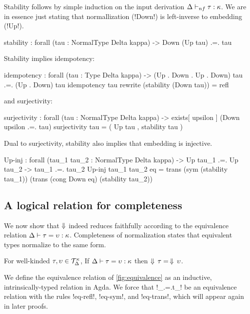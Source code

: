 \documentclass[sigplan,10pt,anonymous,review]{acmart}\settopmatter{printfolios=true,printccs=false,printacmref=false}
\begin{document}
Stability follows by simple induction on the input derivation $\Delta \vdash_{nf} \tau : \kappa$. We are in essence just stating that normallization (!Down!) is left-inverse to embedding (!Up!).

\begin{agda}
stability : forall (tau : NormalType Delta kappa) -> Down (Up tau) .=. tau
\end{agda}
Stability implies idempotency:
\begin{agda}
idempotency : forall (tau : Type Delta kappa) -> 
              (Up . Down . Up . Down) tau .=. (Up . Down) tau
idempotency tau rewrite (stability (Down tau)) = refl
\end{agda}
\Ni and surjectivity: 

\begin{agda}
surjectivity : forall (tau : NormalType Delta kappa) -> 
               exists[ upsilon ] (Down upsilon .=. tau)
surjectivity tau = ( Up tau , stability tau )
\end{agda}

Dual to surjectivity, stability also implies that embedding is injective.

\begin{agda}
Up-inj : forall (tau_1  tau_2 : NormalType Delta kappa) -> 
         Up tau_1 .=. Up tau_2 -> tau_1 .=. tau_2
Up-inj  tau_1  tau_2  eq = 
  trans 
    (sym (stability tau_1))          
    (trans 
      (cong Down eq)
      (stability tau_2))
\end{agda}

\subsection{A logical relation for completeness}

We now show that $\Downarrow$ indeed reduces faithfully according to the equivalence relation $\Delta \vdash \tau = \upsilon : \kappa$. Completeness of normalization states that equivalent types normalize to the same form.

\ifthms
\begin{theorem}[Completeness]
For well-kinded $\tau , \upsilon \in {\mathcal T}_{\Delta}^{\kappa}$, If $\Delta \vdash \tau = \upsilon : \kappa$ then $\Downarrow\, \tau = \, \Downarrow \, \upsilon$.
\end{theorem}
\fi

We define the equivalence relation of \cref{fig:equivalence} as an inductive, intrinsically-typed relation in Agda. We force that !_.=.t_! be an equivalence relation with the rules !eq-refl!, !eq-sym!, and !eq-trans!, which will appear again in later proofs. 
\end{document}
